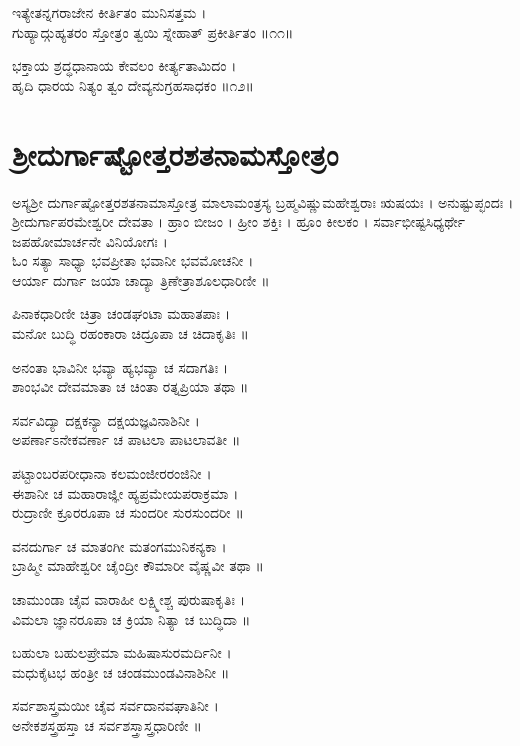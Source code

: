 ಇತ್ಯೇತನ್ನಗರಾಜೇನ ಕೀರ್ತಿತಂ ಮುನಿಸತ್ತಮ ।\\
ಗುಹ್ಯಾದ್ಗುಹ್ಯತರಂ ಸ್ತೋತ್ರಂ ತ್ವಯಿ ಸ್ನೇಹಾತ್ ಪ್ರಕೀರ್ತಿತಂ ॥೧೧॥

ಭಕ್ತಾಯ ಶ್ರದ್ಧಧಾನಾಯ ಕೇವಲಂ ಕೀರ್ತ್ಯತಾಮಿದಂ ।\\
ಹೃದಿ ಧಾರಯ ನಿತ್ಯಂ ತ್ವಂ ದೇವ್ಯನುಗ್ರಹಸಾಧಕಂ ॥೧೨॥
\section{ಶ್ರೀದುರ್ಗಾಷ್ಟೋತ್ತರಶತನಾಮಸ್ತೋತ್ರಂ}

ಅಸ್ಯಶ್ರೀ ದುರ್ಗಾಷ್ಟೋತ್ತರಶತನಾಮಾಸ್ತೋತ್ರ ಮಾಲಾಮಂತ್ರಸ್ಯ ಬ್ರಹ್ಮವಿಷ್ಣುಮಹೇಶ್ವರಾಃ ಋಷಯಃ । ಅನುಷ್ಟುಪ್ಛಂದಃ । ಶ್ರೀದುರ್ಗಾಪರಮೇಶ್ವರೀ ದೇವತಾ । ಹ್ರಾಂ ಬೀಜಂ । ಹ್ರೀಂ ಶಕ್ತಿಃ । ಹ್ರೂಂ ಕೀಲಕಂ । ಸರ್ವಾಭೀಷ್ಟಸಿಧ್ಯರ್ಥೇ ಜಪಹೋಮಾರ್ಚನೇ ವಿನಿಯೋಗಃ ।\\

ಓಂ ಸತ್ಯಾ ಸಾಧ್ಯಾ ಭವಪ್ರೀತಾ ಭವಾನೀ ಭವಮೋಚನೀ ।\\
ಆರ್ಯಾ ದುರ್ಗಾ ಜಯಾ ಚಾದ್ಯಾ ತ್ರಿಣೇತ್ರಾಶೂಲಧಾರಿಣೀ ॥

ಪಿನಾಕಧಾರಿಣೀ ಚಿತ್ರಾ ಚಂಡಘಂಟಾ ಮಹಾತಪಾಃ ।\\
ಮನೋ ಬುದ್ಧಿ ರಹಂಕಾರಾ ಚಿದ್ರೂಪಾ ಚ ಚಿದಾಕೃತಿಃ ॥

ಅನಂತಾ ಭಾವಿನೀ ಭವ್ಯಾ ಹ್ಯಭವ್ಯಾ ಚ ಸದಾಗತಿಃ ।\\
ಶಾಂಭವೀ ದೇವಮಾತಾ ಚ ಚಿಂತಾ ರತ್ನಪ್ರಿಯಾ ತಥಾ ॥

ಸರ್ವವಿದ್ಯಾ ದಕ್ಷಕನ್ಯಾ ದಕ್ಷಯಜ್ಞವಿನಾಶಿನೀ ।\\
ಅಪರ್ಣಾಽನೇಕವರ್ಣಾ ಚ ಪಾಟಲಾ ಪಾಟಲಾವತೀ ॥

ಪಟ್ಟಾಂಬರಪರೀಧಾನಾ ಕಲಮಂಜೀರರಂಜಿನೀ ।\\
ಈಶಾನೀ ಚ ಮಹಾರಾಜ್ಞೀ ಹ್ಯಪ್ರಮೇಯಪರಾಕ್ರಮಾ ।\\
ರುದ್ರಾಣೀ ಕ್ರೂರರೂಪಾ ಚ ಸುಂದರೀ ಸುರಸುಂದರೀ ॥

ವನದುರ್ಗಾ ಚ ಮಾತಂಗೀ ಮತಂಗಮುನಿಕನ್ಯಕಾ ।\\
ಬ್ರಾಹ್ಮೀ ಮಾಹೇಶ್ವರೀ ಚೈಂದ್ರೀ ಕೌಮಾರೀ ವೈಷ್ಣವೀ ತಥಾ ॥

ಚಾಮುಂಡಾ ಚೈವ ವಾರಾಹೀ ಲಕ್ಷ್ಮೀಶ್ಚ ಪುರುಷಾಕೃತಿಃ ।\\
ವಿಮಲಾ ಜ್ಞಾನರೂಪಾ ಚ ಕ್ರಿಯಾ ನಿತ್ಯಾ ಚ ಬುದ್ಧಿದಾ ॥

ಬಹುಲಾ ಬಹುಲಪ್ರೇಮಾ ಮಹಿಷಾಸುರಮರ್ದಿನೀ ।\\
ಮಧುಕೈಟಭ ಹಂತ್ರೀ ಚ ಚಂಡಮುಂಡವಿನಾಶಿನೀ ॥

ಸರ್ವಶಾಸ್ತ್ರಮಯೀ ಚೈವ ಸರ್ವದಾನವಘಾತಿನೀ ।\\
ಅನೇಕಶಸ್ತ್ರಹಸ್ತಾ ಚ ಸರ್ವಶಸ್ತ್ರಾಸ್ತ್ರಧಾರಿಣೀ ॥

